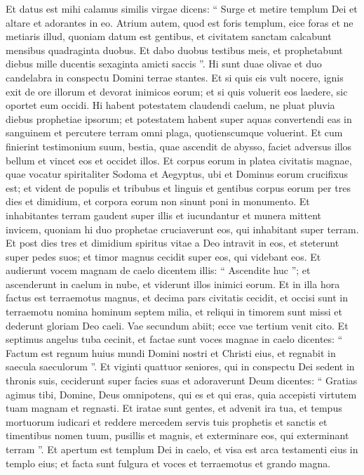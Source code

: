 \begin{biblechapter}
\begin{biblechapter}
\begin{biblechapter}
\begin{biblechapter}
\begin{biblechapter}
\begin{biblechapter}
\begin{biblechapter}
\begin{biblechapter}
\begin{biblechapter}
\begin{biblechapter}
\begin{biblechapter}
\verse Et datus est mihi calamus similis virgae dicens: “ Surge et metire templum Dei et altare et adorantes in eo. 
\verse Atrium autem, quod est foris templum, eice foras et ne metiaris illud, quoniam datum est gentibus, et civitatem sanctam calcabunt mensibus quadraginta duobus. 
\verse Et dabo duobus testibus meis, et prophetabunt diebus mille ducentis sexaginta amicti saccis ”. 
\verse Hi sunt duae olivae et duo candelabra in conspectu Domini terrae stantes. 
 \verse Et si quis eis vult nocere, ignis exit de ore illorum et devorat inimicos eorum; et si quis voluerit eos laedere, sic oportet eum occidi. 
\verse Hi habent potestatem claudendi caelum, ne pluat pluvia diebus prophetiae ipsorum; et potestatem habent super aquas convertendi eas in sanguinem et percutere terram omni plaga, quotienscumque voluerint. 
\verse Et cum finierint testimonium suum, bestia, quae ascendit de abysso, faciet adversus illos bellum et vincet eos et occidet illos. 
\verse Et corpus eorum in platea civitatis magnae, quae vocatur spiritaliter Sodoma et Aegyptus, ubi et Dominus eorum crucifixus est; 
\verse et vident de populis et tribubus et linguis et gentibus corpus eorum per tres dies et dimidium, et corpora eorum non sinunt poni in monumento. 
\verse Et inhabitantes terram gaudent super illis et iucundantur et munera mittent invicem, quoniam hi duo prophetae cruciaverunt eos, qui inhabitant super terram.
 \verse Et post dies tres et dimidium spiritus vitae a Deo intravit in eos, et steterunt super pedes suos; et timor magnus cecidit super eos, qui videbant eos. 
\verse Et audierunt vocem magnam de caelo dicentem illis: “ Ascendite huc ”; et ascenderunt in caelum in nube, et viderunt illos inimici eorum. 
\verse Et in illa hora factus est terraemotus magnus, et decima pars civitatis cecidit, et occisi sunt in terraemotu nomina hominum septem milia, et reliqui in timorem sunt missi et dederunt gloriam Deo caeli.
 \verse Vae secundum abiit; ecce vae tertium venit cito.
 \verse Et septimus angelus tuba cecinit, et factae sunt voces magnae in caelo dicentes: “ Factum est regnum huius mundi Domini nostri et Christi eius, et regnabit in saecula saeculorum ”.
 \verse Et viginti quattuor seniores, qui in conspectu Dei sedent in thronis suis, ceciderunt super facies suas et adoraverunt Deum 
\verse dicentes:
 “ Gratias agimus tibi,
 Domine, Deus omnipotens,
 qui es et qui eras,
 quia accepisti virtutem tuam magnam et regnasti.
 \verse Et iratae sunt gentes,
 et advenit ira tua, et tempus mortuorum iudicari
 et reddere mercedem servis tuis prophetis et sanctis
 et timentibus nomen tuum, pusillis et magnis,
 et exterminare eos, qui exterminant terram ”.
 \verse Et apertum est templum Dei in caelo, et visa est arca testamenti eius in templo eius; et facta sunt fulgura et voces et terraemotus et grando magna.
 

\end{biblechapter}
\end{biblechapter}
\end{biblechapter}
\end{biblechapter}
\end{biblechapter}
\end{biblechapter}
\end{biblechapter}
\end{biblechapter}
\end{biblechapter}
\end{biblechapter}
\end{biblechapter}
